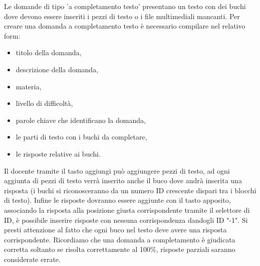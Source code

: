 \documentclass[a4paper, titlepage]{article}
\begin{document}
	 Le domande di tipo 'a completamento testo' presentano un testo con dei buchi dove devono essere inseriti i pezzi di testo o i file multimediali mancanti.
	 Per creare una domanda a completamento testo è necessario compilare nel relativo form:
	 \begin{itemize}
	 	\item titolo della domanda,
	 	\item descrizione della domanda,
	 	\item materia,
	 	\item livello di difficoltà,
	 	\item parole chiave che identificano la domanda,
	 	\item le parti di testo con i buchi da completare,
	 	\item le risposte relative ai buchi.
	 \end{itemize}
	 Il docente tramite il tasto aggiungi può aggiungere pezzi di testo, ad ogni aggiunta di pezzi di testo verrà inserito anche il buco dove andrà inserita una risposta (i buchi si riconosceranno da un numero ID crescente dispari tra i blocchi di testo). Infine le risposte dovranno essere aggiunte con il tasto apposito, associando la risposta alla posizione giusta corrispondente tramite il selettore di ID, è possibile inserire risposte con nessuna corrispondenza dandogli ID "-1". Si presti attenzione al fatto che ogni buco nel testo deve avere una risposta corrispondente. Ricordiamo che una domanda a completamento è giudicata corretta soltanto se risolta correttamente al 100\%, risposte parziali saranno considerate errate.
	 
	 \newpage
\end{document}
